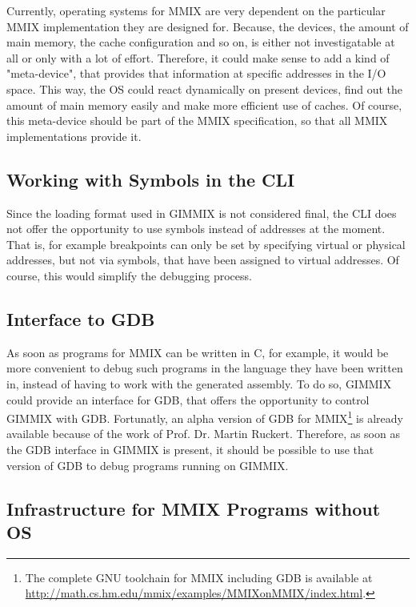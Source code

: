 Currently, operating systems for MMIX are very dependent on the particular MMIX implementation they are designed for. Because, the devices, the amount of main memory, the cache configuration and so on, is either not investigatable at all or only with a lot of effort. Therefore, it could make sense to add a kind of "meta-device", that provides that information at specific addresses in the I/O space. This way, the OS could react dynamically on present devices, find out the amount of main memory easily and make more efficient use of caches. Of course, this meta-device should be part of the MMIX specification, so that all MMIX implementations provide it.

\subsection{Working with Symbols in the CLI}

Since the loading format used in GIMMIX is not considered final, the CLI does not offer the opportunity to use symbols instead of addresses at the moment. That is, for example breakpoints can only be set by specifying virtual or physical addresses, but not via symbols, that have been assigned to virtual addresses. Of course, this would simplify the debugging process.

\subsection{Interface to \protect\gls{GDB}}

As soon as programs for MMIX can be written in C, for example, it would be more convenient to debug such programs in the language they have been written in, instead of having to work with the generated assembly. To do so, GIMMIX could provide an interface for \gls{GDB}, that offers the opportunity to control GIMMIX with \gls{GDB}. Fortunatly, an alpha version of \gls{GDB} for MMIX\footnote{The complete GNU toolchain for MMIX including \gls{GDB} is available at \url{http://math.cs.hm.edu/mmix/examples/MMIXonMMIX/index.html}.} is already available because of the work of Prof. Dr. Martin Ruckert. Therefore, as soon as the \gls{GDB} interface in GIMMIX is present, it should be possible to use that version of \gls{GDB} to debug programs running on GIMMIX.

\subsection{Infrastructure for MMIX Programs without OS}


